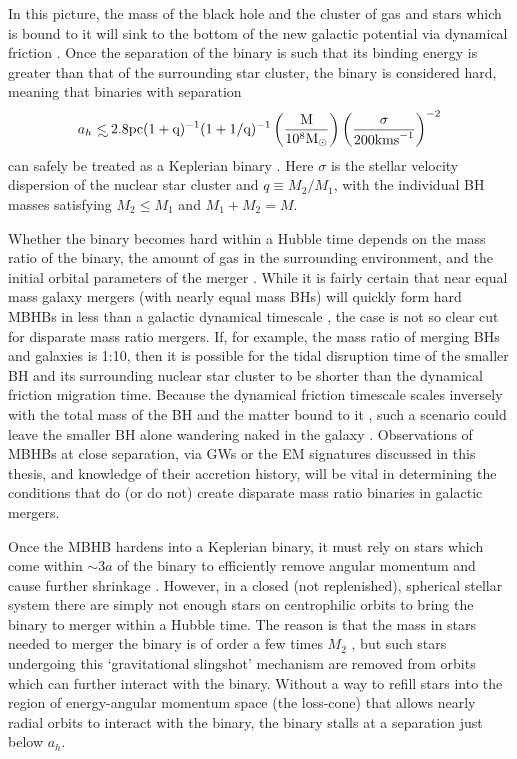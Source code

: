 In this picture, the mass of the black hole and the cluster of gas and stars
which is bound to it will sink to the bottom of the new galactic potential via
dynamical friction \citep{Begel:Blan:Rees:1980, Chandrasekhar:1943}. Once the
separation of the binary is such that its binding energy is
greater than that of the surrounding star cluster, the binary is considered
hard, meaning that binaries with separation
\begin{equation}
a_h \lsim 2.8 \rm{pc} (1+q)^{-1} (1+1/q)^{-1}  \left( \frac{M}{10^8 \Msun} \right)  
\left( \frac{\sigma}{200 \rm{km s}^{-1}} \right)^{-2}
\end{equation}
can safely be treated as a Keplerian binary
\citep[\emph{e.g.}][]{MerrittMilos:2005}. Here $\sigma$ is the stellar
velocity dispersion of the nuclear star cluster and $q\equiv M_2/M_1$, with
the individual BH masses satisfying $M_2 \leq M_1$ and $M_1+M_2=M$.

Whether the binary becomes hard within a Hubble time depends on the mass ratio
of the binary, the amount of gas in the surrounding environment, and the
initial orbital parameters of the merger \citep{Mayer:2013:MBHBGasRev}. While
it is fairly certain that near equal mass galaxy mergers (with nearly equal
mass BHs) will quickly form hard MBHBs in less than a galactic dynamical
timescale \citep{Mayer:2007, Chapon:2013}, the case is not so clear cut for
disparate mass ratio mergers. If, for example, the mass ratio of merging BHs
and galaxies is 1:10, then it is possible for the tidal disruption time of the
smaller BH and its surrounding nuclear star cluster to be shorter than the
dynamical friction migration time. Because the dynamical friction timescale
scales inversely with the total mass of the BH and the matter bound to it
\citep{Chandrasekhar:1943, ColpiDotti:2009}, such a scenario could leave the
smaller BH alone wandering naked in the galaxy \citep{Callegari:2011,
Mayer:2013}. Observations of MBHBs at close separation, via GWs or the EM
signatures discussed in this thesis, and knowledge of their accretion history,
will be vital in determining the conditions that do (or do not) create
disparate mass ratio binaries in galactic mergers.

Once the MBHB hardens into a Keplerian binary, it must rely on stars which
come within $\sim3a$ of the binary to efficiently remove angular momentum and
cause further shrinkage \citep{Saslaw:1974}. However, in a closed (not
replenished),  spherical stellar system there are simply not enough stars on
centrophilic orbits to bring the binary to merger within a Hubble time. The
reason is that the mass in stars needed to merger the binary is of order a few
times $M_2$ \citep{MerrittMilos:2005}, but such stars undergoing this
`gravitational slingshot' mechanism are removed from orbits which can further
interact with the binary. Without a way to refill stars into the region of
energy-angular momentum space (the loss-cone) that allows nearly radial orbits
to interact with the binary, the binary stalls at a separation just below
$a_h$.

